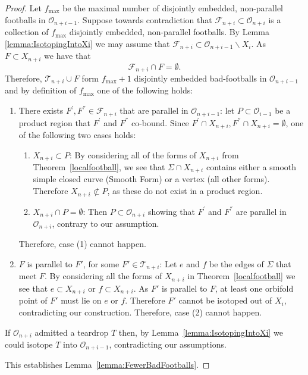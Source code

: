 \documentclass[12pt,reqno]{amsart}
\theoremstyle{plain}
\theoremstyle{definition}
\numberwithin{subcase}{case}
\theoremstyle{plain}
\theoremstyle{definition}
\newcommand{\OO}{\mathcal{O}}
\begin{document}
\begin{proof}
Let $f_{\text{max}}$ be the maximal number of disjointly embedded, non-parallel footballs in $\OO_{n+i-1}$. Suppose towards contradiction that $\mathcal{F}_{n+i}\subset\OO_{n+i}$ is a collection of $f_{\text{max}}$ disjointly embedded, non-parallel footballs. By Lemma \ref{lemma:IsotopingIntoXi} we may assume that $\mathcal{F}_{n+i}\subset \OO_{n+i-1}\backslash X_{i}$. As $F \subset X_{n+i}$ we have that
$$\mathcal{F}_{n+i}\cap F=\emptyset.$$ 
Therefore, $\mathcal{T}_{n+i}\cup F$ form $f_{\text{max}}+1$ disjointly embedded bad-footballs in $\OO_{n+i-1}$ and by definition of \(f_{\text{max}}\) one of the following holds:
\begin{enumerate}
\item There exists $F^{'},F^{''}\in\mathcal{F}_{n+i}$ that are parallel in $\OO_{n+i-1}$: let $P\subset\OO_{i-1}$ be a product region that $F^{'}$ and $F^{''}$ co-bound. Since $F^{'}\cap X_{n+i}, F^{''}\cap X_{n+i}=\emptyset$, one of the following two cases holds:
\begin{enumerate}
\item $X_{n+i} \subset P$: By considering all of the forms of $X_{n+i}$ from 
Theorem~\ref{localfootball},
we see that $\Sigma\cap X_{n+i}$ contains either a smooth simple closed curve (Smooth Form) or a vertex (all other forms). Therefore $X_{n+i}\not\subset P$, as these do not exist in a product region.
\item $X_{n+i} \cap P=\emptyset$: Then $P\subset \OO_{n+i}$ showing that $F^{'}$ and $F^{''}$ are parallel in $\OO_{n+i}$, contrary to our assumption.
\end{enumerate}
Therefore, case (1) cannot happen. 

\item $F$ is parallel to $F'$, for some $F'\in\mathcal{T}_{n+i}$: Let \(e\) and \(f\) be the edges of $\Sigma$ that meet $F$.  By considering all the forms of $X_{n+i}$ in Theorem~\ref{localfootball} we see that $e \subset X_{n+i}$ or $f \subset X_{n+i}$. As $F'$ is parallel to $F$, at least one orbifold point of $F'$ must lie on $e$ or \(f\).  
Therefore $F'$ cannot be isotoped out of \(X_{i}\), contradicting our construction. 
Therefore, case (2) cannot happen.
\end{enumerate}
If \(\OO_{n+i}\) admitted a teardrop \(T\) then, by Lemma~\ref{lemma:IsotopingIntoXi} we could isotope \(T\) into \(\OO_{n+i-1}\), contradicting our assumptions.

This establishes Lemma~\ref{lemma:FewerBadFootballs}.
\end{proof}
\end{document}
